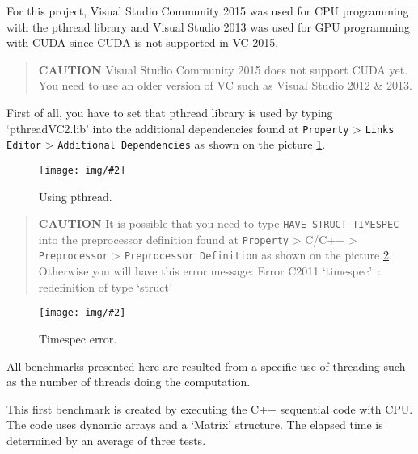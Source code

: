 \documentclass[]{article}
\newcommand\myFigure[3]{%
	\begin{figure}[h]
		\begin{center}
			\texttt{[image: img/\#2]}
		\end{center}
		\setlength\abovecaptionskip{-1px}
		\caption{#1.\label{fig:#2}}
	\end{figure}
}
\begin{document}

For this project, Visual Studio Community 2015 was used for CPU
programming with the pthread library and Visual Studio 2013 was used for
GPU programming with CUDA since CUDA is not supported in VC 2015.

\begin{quote}
\textbf{CAUTION} Visual Studio Community 2015 does not support CUDA yet.
You need to use an older version of VC such as Visual Studio 2012 \& 2013.
\end{quote}

First of all, you have to set that pthread library is used by typing
`pthreadVC2.lib' into the additional dependencies found at \verb/Property/
\textgreater{} \verb/Links Editor/ \textgreater{} \verb/Additional Dependencies/
as shown on the picture \ref{fig:config-000}.

\myFigure{Using pthread}{config-000}{0.4}

\begin{quote}
\textbf{CAUTION} It is possible that you need to type
\verb/HAVE STRUCT TIMESPEC/ into the preprocessor definition found at
\verb/Property/ \textgreater{} C/C++ \textgreater{} \verb/Preprocessor/
\textgreater{} \verb/Preprocessor Definition/ as shown on the picture \ref{fig:config-001}.
Otherwise you will have this error message: Error C2011 `timespec'~:
redefinition of type `struct'
\end{quote}

\myFigure{Timespec error}{config-001}{0.4}



All benchmarks presented here are resulted from a specific use of
threading such as the number of threads doing the computation.


This first benchmark is created by executing the C++ sequential code
with CPU. The code uses dynamic arrays and a `Matrix' structure.
The elapsed time is determined by an average of three tests.
\end{document}
